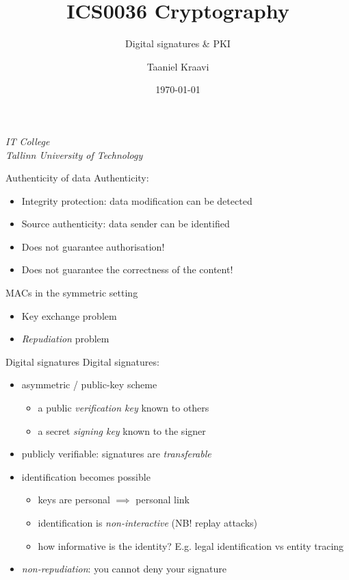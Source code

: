 \graphicspath{ {../../images/} }
\usetikzlibrary{external}
\usepackage{changepage}
\usetikzlibrary{arrows.meta}

\title{ICS0036 Cryptography}
\subtitle{Digital signatures \& PKI}
\date{\today}
\author{Taaniel Kraavi}
\institute%
{%
  \textit{IT College}\\
  \textit{Tallinn University of Technology}
}


\begin{frame}
  \titlepage
\end{frame}

\begin{frame}{Authenticity of data}
  Authenticity:
  \begin{itemize}[<+(1)->]
    \item Integrity protection: data modification can be detected
    \item Source authenticity: data sender can be identified
    \item Does not guarantee authorisation!
    \item Does not guarantee the correctness of the content!
  \end{itemize}

  \vspace*{1em}

  \pause
  MACs in the symmetric setting
  \begin{itemize}[<+(1)->]
    \item Key exchange problem
    \item \emph{Repudiation} problem
  \end{itemize}
\end{frame}

\begin{frame}{Digital signatures}
  Digital signatures:
  \begin{itemize}[<+(1)->]
    \item asymmetric / public-key scheme
    \begin{itemize}
      \item a public \emph{verification key} known to others
      \item a secret \emph{signing key} known to the signer
    \end{itemize}
    \item publicly verifiable: signatures are \emph{transferable}
    \item identification becomes possible
    \begin{itemize}
      \item keys are personal $\implies$ personal link
      \item identification is \emph{non-interactive} (NB! replay attacks)
      \item how informative is the identity? E.g. legal identification vs entity tracing
    \end{itemize}
    \item \emph{non-repudiation}: you cannot deny your signature
  \end{itemize}
\end{frame}

